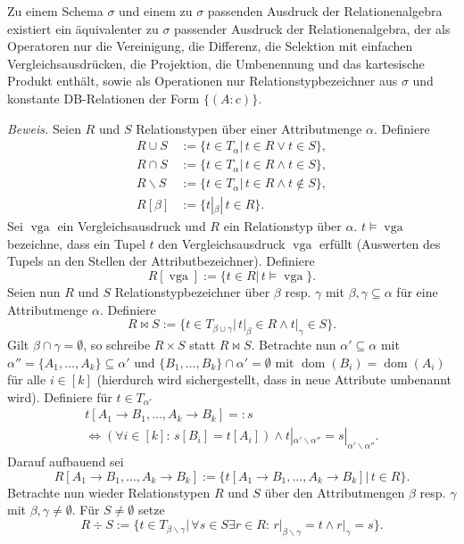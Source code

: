 \documentclass[12pt,a4paper]{amsart}
\DeclareMathOperator{\dom}{dom}
\DeclareMathOperator{\vga}{vga}
\begin{document}
\begin{aufgabe1}
Zu einem Schema $\sigma$ und einem zu $\sigma$ passenden Ausdruck der Relationenalgebra existiert ein äquivalenter zu $\sigma$ passender Ausdruck der Relationenalgebra,
der als Operatoren nur die Vereinigung, die Differenz, die Selektion mit einfachen Vergleichsausdrücken, die Projektion, die Umbenennung und das kartesische Produkt enthält,
sowie als Operationen nur Relationstypbezeichner aus $\sigma$ und konstante DB-Relationen der Form $\{(A:c)\}$.
\end{aufgabe1}

\medskip

{\em Beweis.}
Seien $R$ und $S$ Relationstypen über einer Attributmenge $\alpha$. Definiere
\begin{equation*}
\begin{split}
R\cup S & := \{t\in T_{\alpha}|\,t\in R\lor t\in S\},\\
R\cap S & := \{t\in T_{\alpha}|\,t\in R\land t\in S\},\\
R\backslash S &:= \{t\in T_{\alpha}|\,t\in R\land t\not\in S\},\\
R[\beta] &:= \{t|_{\beta}|\,t\in R\}.
\end{split}
\end{equation*}
Sei $\vga$ ein Vergleichsausdruck und $R$ ein Relationstyp über $\alpha$. $t\models\vga$ bezeichne, dass ein Tupel $t$ den Vergleichsausdruck $\vga$ erfüllt (Auswerten des Tupels an den Stellen der Attributbezeichner). Definiere
\[
R[\vga] := \{t\in R|\,t\models\vga\}.
\]
Seien nun $R$ und $S$ Relationstypbezeichner über $\beta$ resp. $\gamma$ mit $\beta,\gamma\subseteq \alpha$ für eine Attributmenge $\alpha$. Definiere
\[
R\Join S := \{t\in T_{\beta\cup\gamma}|\,t|_{\beta}\in R\land t|_{\gamma}\in S\}.
\]
Gilt $\beta\cap\gamma=\emptyset$, so schreibe $R\times S$ statt $R\Join S$. Betrachte nun $\alpha'\subseteq\alpha$ mit $\alpha''=\{A_1,\dots,A_k\}\subseteq\alpha'$ und
$\{B_1,\dots,B_k\}\cap\alpha'=\emptyset$ mit $\dom(B_i)=\dom(A_i)$ für alle $i\in[k]$ (hierdurch wird sichergestellt, dass in neue Attribute umbenannt wird). Definiere für $t\in T_{\alpha'}$
\begin{multline*}
t[A_1\rightarrow B_1,\dots,A_k\rightarrow B_k]=:s \\
\Leftrightarrow (\forall i\in[k]:\,s[B_i]=t[A_i])\land t|_{\alpha'\backslash \alpha''}=s|_{\alpha'\backslash\alpha''}.
\end{multline*}
Darauf aufbauend sei
\[
R[A_1\rightarrow B_1,\dots, A_k\rightarrow B_k] := \{t[A_1\rightarrow B_1,\dots,A_k\rightarrow B_k]|\,t\in R\}.
\]
Betrachte nun wieder Relationstypen $R$ und $S$ über den Attributmengen $\beta$ resp. $\gamma$ mit $\beta,\gamma\neq \emptyset$. Für $S\neq\emptyset$ setze
\[
R\div S := \{t\in T_{\beta\backslash\gamma}|\,\forall s\in S\exists r\in R:\,r|_{\beta\backslash\gamma}=t\land r|_{\gamma}=s\}.
\]
\end{document}
